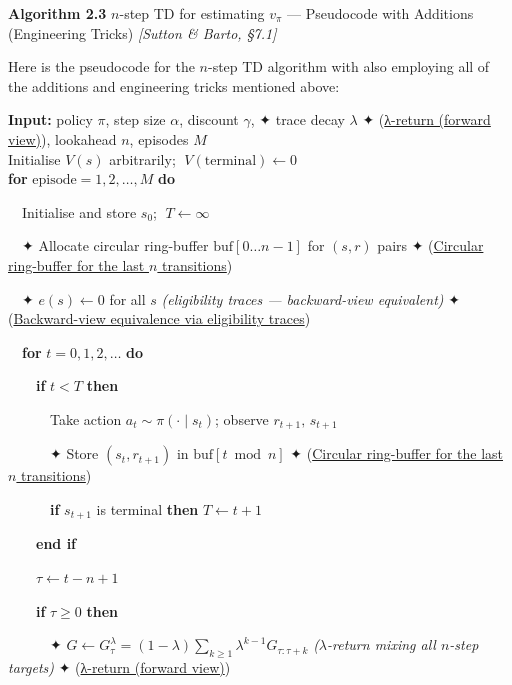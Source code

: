 \documentclass[11pt]{article}
\begin{document}
    \begin{pseudobox}

\textbf{Algorithm 2.3} \(n\)-step TD for estimating \(v_\pi\) ---
Pseudocode with Additions (Engineering Tricks) \emph{{[}Sutton \& Barto,
§7.1{]}}

\tcbline

Here is the pseudocode for the \(n\)-step TD algorithm with also
employing all of the additions and engineering tricks mentioned above:

\textbf{Input:} policy \(\pi\), step size \(\alpha\), discount
\(\gamma\), ✦ trace decay \(\lambda\) ✦ (\hyperref[trick-2-3-1]{λ-return
(forward view)}), lookahead \(n\), episodes \(M\)\\
Initialise \(V(s)\) arbitrarily; \(\;V(\text{terminal}) \leftarrow 0\)\\
\textbf{for} \(\text{episode} = 1, 2, \ldots, M\) \textbf{do}\\
\strut ~~Initialise and store \(s_0\); \(\;T \leftarrow \infty\)\\
\strut ~~✦ Allocate circular ring-buffer \(\mathrm{buf}[0\ldots n{-}1]\)
for \((s, r)\) pairs ✦ (\hyperref[trick-2-3-6]{Circular ring-buffer for
the last \(n\) transitions})\\
\strut ~~✦ \(e(s) \leftarrow 0\) for all \(s\) \emph{(eligibility traces
--- backward-view equivalent)} ✦ (\hyperref[trick-2-3-2]{Backward-view
equivalence via eligibility traces})\\
\strut ~~\textbf{for} \(t = 0, 1, 2, \ldots\) \textbf{do}\\
\strut ~~~~\textbf{if} \(t < T\) \textbf{then}\\
\strut ~~~~~~Take action \(a_t \sim \pi(\cdot \mid s_t)\); observe
\(r_{t+1},\, s_{t+1}\)\\
\strut ~~~~~~✦ Store \((s_t, r_{t+1})\) in \(\mathrm{buf}[t \bmod n]\) ✦
(\hyperref[trick-2-3-6]{Circular ring-buffer for the last \(n\)
transitions})\\
\strut ~~~~~~\textbf{if} \(s_{t+1}\) is terminal \textbf{then}
\(T \leftarrow t + 1\)\\
\strut ~~~~\textbf{end if}\\
\strut ~~~~\(\tau \leftarrow t - n + 1\)\\
\strut ~~~~\textbf{if} \(\tau \geq 0\) \textbf{then}\\
\strut ~~~~~~✦
\(G \leftarrow G^\lambda_\tau = (1-\lambda)\sum_{k\geq 1}\lambda^{k-1} G_{\tau:\tau+k}\)
\emph{(\(\lambda\)-return mixing all \(n\)-step targets)} ✦
(\hyperref[trick-2-3-1]{λ-return (forward view)})\\

\end{pseudobox}
\end{document}
